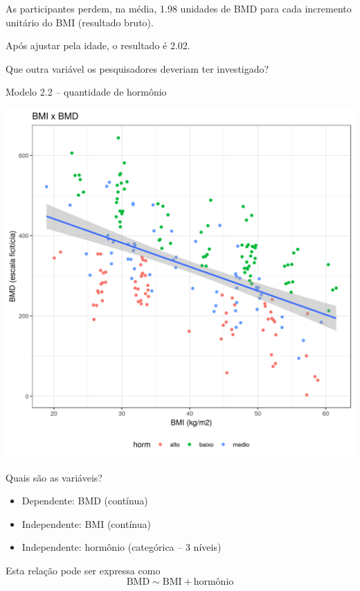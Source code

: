 \documentclass{beamer}
\begin{document}
\begin{frame}
  \begin{block}{}
    As participantes perdem, na média, 1.98 unidades de BMD para cada incremento unitário do BMI (resultado bruto).

    \bigskip
    Após ajustar pela idade, o resultado é 2.02.
  \end{block}
\end{frame}

\begin{frame}
  \begin{center}
    Que outra variável os pesquisadores deveriam ter investigado?
  \end{center}
\end{frame}

\begin{frame}{\small Modelo 2.2 -- quantidade de hormônio}
  \begin{center}
    \includegraphics[height=.9\textheight]{Cap31-32/pratica-rlm2_2}
  \end{center}
\end{frame}

\begin{frame}{Quais são as variáveis?}
  \begin{itemize}
  \item Dependente: BMD (contínua)
  \item Independente: BMI (contínua)
  \item Independente: hormônio (categórica -- 3 níveis)
  \end{itemize}
  \vfill
  \begin{block}{Esta relação pode ser expressa como}
    \begin{displaymath}
      \text{BMD} \sim \text{BMI} + \text{hormônio}
    \end{displaymath}
  \end{block}
\end{frame}
\end{document}
